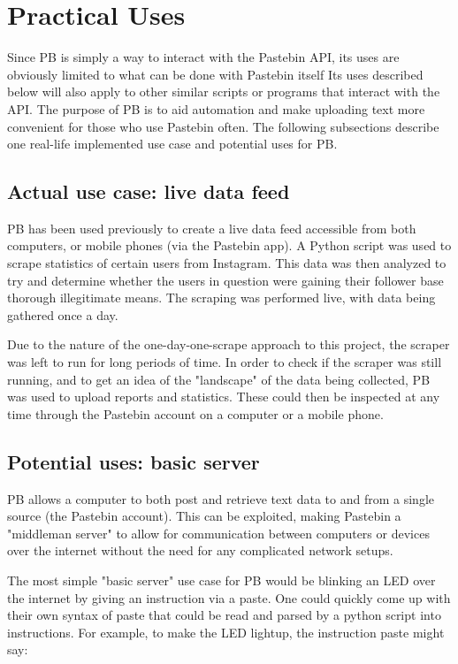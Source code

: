 \documentclass[11pt, a4paper]{article}
\begin{document}
  \section{Practical Uses}
    Since PB is simply a way to interact with the Pastebin API, its uses are obviously limited to what can be done with Pastebin itself Its uses described below will also apply to other similar scripts or programs that interact with the API. The purpose of PB is to aid automation and make uploading text more convenient for those who use Pastebin often. The following subsections describe one real-life implemented use case and potential uses for PB.

    \subsection{Actual use case: live data feed}
      PB has been used previously to create a live data feed accessible from both computers, or mobile phones (via the Pastebin app). A Python script was used to scrape statistics of certain users from Instagram. This data was then analyzed to try and determine whether the users in question were gaining their follower base thorough illegitimate means. The scraping was performed live, with data being gathered once a day.

      Due to the nature of the one-day-one-scrape approach to this project, the scraper was left to run for long periods of time. In order to check if the scraper was still running, and to get an idea of the "landscape" of the data being collected, PB was used to upload reports and statistics. These could then be inspected at any time through the Pastebin account on a computer or a mobile phone.

    \subsection{Potential uses: basic server}
      PB allows a computer to both post and retrieve text data to and from a single source (the Pastebin account). This can be exploited, making Pastebin a "middleman server" to allow for communication between computers or devices over the internet without the need for any complicated network setups.

      The most simple "basic server" use case for PB would be blinking an LED over the internet by giving an instruction via a paste. One could quickly come up with their own syntax of paste that could be read and parsed by a python script into instructions. For example, to make the LED lightup, the instruction paste might say:
\end{document}
